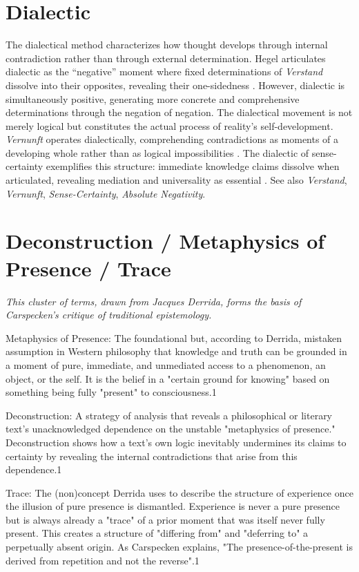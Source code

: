 \documentclass{book}
\begin{document}
\section{Dialectic}

The dialectical method characterizes how thought develops through internal contradiction rather than through external determination. Hegel articulates dialectic as the ``negative'' moment where fixed determinations of \textit{Verstand} dissolve into their opposites, revealing their one-sidedness \parencite[para. 81]{hegel_georg_2010}. However, dialectic is simultaneously positive, generating more concrete and comprehensive determinations through the negation of negation. The dialectical movement is not merely logical but constitutes the actual process of reality's self-development. \textit{Vernunft} operates dialectically, comprehending contradictions as moments of a developing whole rather than as logical impossibilities \parencite{Brandom:2019aa}. The dialectic of sense-certainty exemplifies this structure: immediate knowledge claims dissolve when articulated, revealing mediation and universality as essential \parencite{hegel1977phenomenology}. See also \textit{Verstand}, \textit{Vernunft}, \textit{Sense-Certainty}, \textit{Absolute Negativity}.


\section{Deconstruction / Metaphysics of Presence / Trace}

\textit{This cluster of terms, drawn from Jacques Derrida, forms the basis of Carspecken's critique of traditional epistemology.} 

Metaphysics of Presence: The foundational but, according to Derrida, mistaken assumption in Western philosophy that knowledge and truth can be grounded in a moment of pure, immediate, and unmediated access to a phenomenon, an object, or the self. It is the belief in a "certain ground for knowing" based on something being fully "present" to consciousness.1

Deconstruction: A strategy of analysis that reveals a philosophical or literary text's unacknowledged dependence on the unstable "metaphysics of presence." Deconstruction shows how a text's own logic inevitably undermines its claims to certainty by revealing the internal contradictions that arise from this dependence.1

Trace: The (non)concept Derrida uses to describe the structure of experience once the illusion of pure presence is dismantled. Experience is never a pure presence but is always already a "trace" of a prior moment that was itself never fully present. This creates a structure of "differing from" and "deferring to" a perpetually absent origin. As Carspecken explains, "The presence-of-the-present is derived from repetition and not the reverse".1
\end{document}

